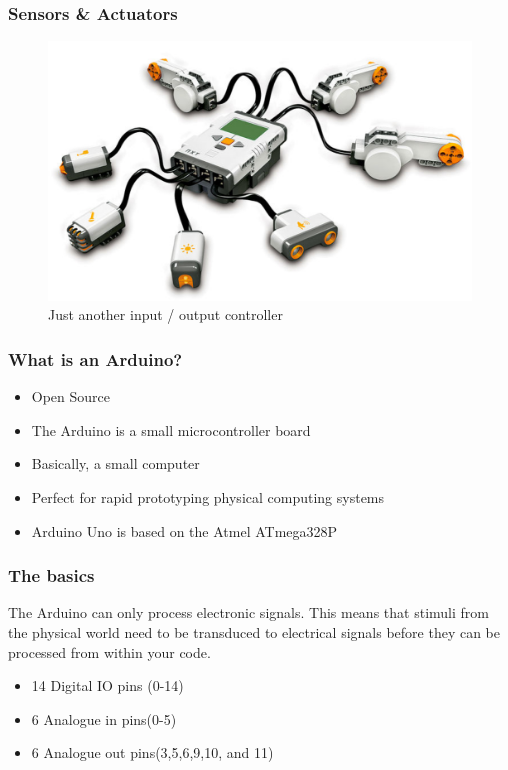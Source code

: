 \begin{frame}
	\frametitle{Sensors \& Actuators}
	\begin{figure}
		\includegraphics[scale=.15]{assets/nxt}  
		\caption{Just another input / output controller }
	\end{figure}
\end{frame}


\begin{frame}
  \frametitle{What is an Arduino?}
  \begin{itemize}
    \item Open Source
    \item The Arduino is a small microcontroller board
    \item Basically, a small computer 
    \item Perfect for rapid prototyping physical computing systems
    \item Arduino Uno is based on the Atmel ATmega328P
  \end{itemize}
\end{frame}



\begin{frame}
  \frametitle{The basics}  
  The Arduino can only process electronic signals. This means that stimuli from the physical world need to be transduced to electrical signals before they can be processed from within your code. 
  
  \begin{itemize}
    \item 14 Digital IO pins (0-14)
    \item 6 Analogue in pins(0-5)
    \item 6 Analogue out pins(3,5,6,9,10, and 11) ~
  \end{itemize}
\end{frame}

